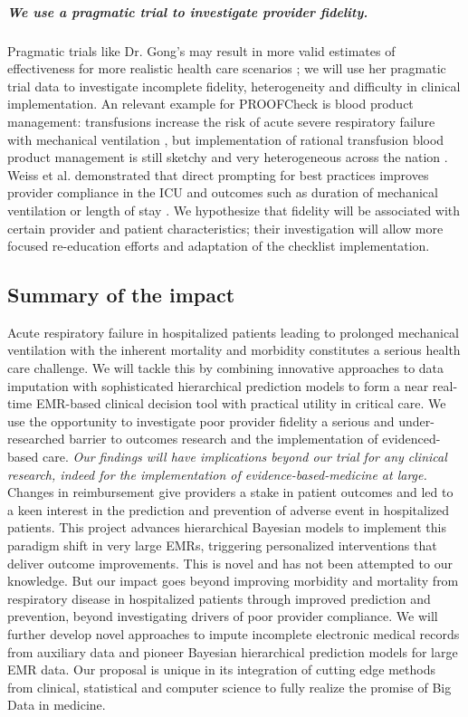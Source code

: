 \documentclass[11pt,notitlepage]{article}
\begin{document}
\subparagraph*{We use a pragmatic trial to investigate provider fidelity.} Pragmatic trials like Dr. Gong's may result in more valid estimates of effectiveness for more realistic health care scenarios \cite{Selby_22824225,Tosh_21842618}; we will use her pragmatic trial data to investigate incomplete fidelity, heterogeneity and difficulty in clinical implementation. An relevant example for PROOFCheck is blood product management: transfusions increase the risk of acute severe respiratory failure with mechanical ventilation \cite{Kenz_24892308}, but implementation of rational transfusion blood product management is still sketchy and very heterogeneous across the nation \cite{Likosky_20488928}. Weiss et al. demonstrated that direct prompting for best practices improves provider compliance in the ICU and outcomes such as duration of mechanical ventilation or length of stay \cite{Weiss_21616996}. We hypothesize that fidelity will be associated with certain provider and patient characteristics; their investigation will allow more focused re-education efforts and adaptation of the checklist implementation. 

\subsection*{Summary of the impact}
Acute respiratory failure in hospitalized patients leading to prolonged mechanical ventilation with the inherent mortality and morbidity constitutes a serious health care challenge. We will tackle this by combining innovative approaches to data imputation with sophisticated hierarchical prediction models to form a near real-time EMR-based clinical decision tool with practical utility in critical care. We use the opportunity to investigate poor provider fidelity a serious and under-researched barrier to outcomes research and the implementation of evidenced-based care. \textit{Our findings will have implications beyond our trial for any clinical research, indeed for the implementation of evidence-based-medicine at large.} Changes in reimbursement give providers a stake in patient outcomes and led to a keen interest in the prediction and prevention of adverse event in hospitalized patients. This project advances hierarchical Bayesian models to implement this paradigm shift in very large EMRs, triggering personalized interventions that deliver outcome improvements. This is novel and has not been attempted to our knowledge. But our impact goes beyond improving morbidity and mortality from respiratory disease in hospitalized patients through improved prediction and prevention, beyond investigating drivers of poor provider compliance. We will further develop novel approaches to impute incomplete electronic medical records from auxiliary data and pioneer Bayesian hierarchical prediction models for large EMR data. Our proposal is unique in its integration of cutting edge methods from clinical, statistical and computer science to fully realize the promise of Big Data in medicine.
\end{document}
